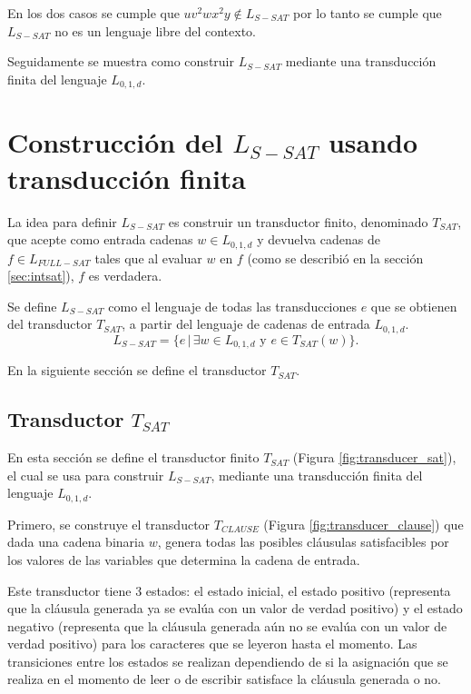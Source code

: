 \documentclass[12pt]{article}
\begin{document}
En los dos casos se cumple que $uv^2wx^2y\notin L_{S-SAT}$ por lo tanto se cumple que $L_{S-SAT}$ no es un lenguaje libre del contexto.



Seguidamente se muestra como construir $L_{S-SAT}$ mediante una transducción finita del lenguaje $L_{0,1,d}$.

\section{Construcción del $L_{S-SAT}$ usando transducción finita}

La idea para definir $L_{S-SAT}$ es construir un transductor finito, denominado $T_{SAT}$, que acepte como 
entrada cadenas $w\in L_{0,1,d}$ y devuelva cadenas de $f\in L_{FULL-SAT}$ tales que al evaluar $w$ en $f$ (como se describió en la sección \ref{sec:intsat}), $f$ es verdadera.

Se define $L_{S-SAT}$ como el lenguaje de todas las transducciones $e$ que se obtienen del transductor
$T_{SAT}$, a partir del lenguaje de cadenas de entrada $L_{0,1,d}$.
$$L_{S-SAT} = \{e\,|\,\exists w \in L_{0,1,d} \text{ y } e \in T_{SAT}(w) \}.$$

En la siguiente sección se define el transductor $T_{SAT}$.

\subsection{Transductor $T_{SAT}$}
\label{sec:tsat}

En esta sección se define el transductor finito $T_{SAT}$ (Figura \ref{fig:transducer_sat}), el cual se usa para construir $L_{S-SAT}$, mediante una transducción finita del lenguaje $L_{0,1,d}$.

Primero, se construye el transductor $T_{CLAUSE}$ (Figura \ref{fig:transducer_clause}) que dada una cadena binaria $w$, genera todas las posibles cláusulas satisfacibles por los valores de las variables que determina la cadena de entrada.

Este transductor tiene 3 estados: el estado inicial, el estado positivo (representa que la cláusula generada ya se evalúa con un valor de verdad positivo) y el estado negativo (representa que la cláusula generada aún no se evalúa con un valor de verdad positivo) para los caracteres que se leyeron hasta el momento. Las transiciones entre los estados se realizan dependiendo de si la asignación que se realiza en el momento de leer o de escribir satisface la cláusula generada o no.
\end{document}
